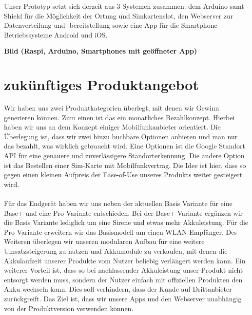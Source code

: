 Unser Prototyp setzt sich derzeit aus 3 Systemen zusammen: dem Arduino samt Shield für die Möglichkeit der Ortung und Simkartenslot, den Webserver zur Datenverteilung und -bereitstellung sowie eine App für die Smartphone Betriebssysteme Android und iOS.

\textbf{Bild (Raspi, Arduino, Smartphones mit geöffneter App)}

\section{zukünftiges Produktangebot}
Wir haben uns zwei Produktkategorien überlegt, mit denen wir Gewinn generieren können. Zum einen ist das ein monatliches Bezahlkonzept. Hierbei haben wir uns an dem Konzept einiger Mobilfunkanbieter orientiert. Die Überlegung ist, dass wir zwei hinzu buchbare Optionen anbieten und man nur das bezahlt, was wirklich gebraucht wird. Eine Optionen ist die Google Standort API für eine genauere und zuverlässigere Standorterkennung. Die andere Option ist das Bestellen einer Sim-Karte mit Mobilfunkvertrag. Die Idee ist hier, dass so gegen einen kleinen Aufpreis der Ease-of-Use unseres Produkts weiter gesteigert wird.
\\
\\
Für das Endgerät haben wir uns neben der aktuellen Basis Variante für eine Base+ und eine Pro Variante entschieden. Bei der Base+ Variante ergänzen wir die Basis Variante lediglich um eine Sirene und etwas mehr Akkuleistung. Für die Pro Variante erweitern wir das Basismodell um einen WLAN Empfänger. Des Weiteren überlegen wir unseren modularen Aufbau für eine weitere Umsatzsteigerung zu nutzen und Akkumodule zu verkaufen, mit denen die Akkulaufzeit unserer Produkte vom Nutzer beliebig verlängert werden kann. Ein weiterer Vorteil ist, dass so bei nachlassender Akkuleistung unser Produkt nicht entsorgt werden muss, sondern der Nutzer einfach mit offiziellen Produkten den Akku wechseln kann. Dies soll verhindern, dass der Kunde auf Drittanbieter zurückgreift.
Das Ziel ist, dass wir unsere Apps und den Webserver unabhängig von der Produktversion verwenden können.

